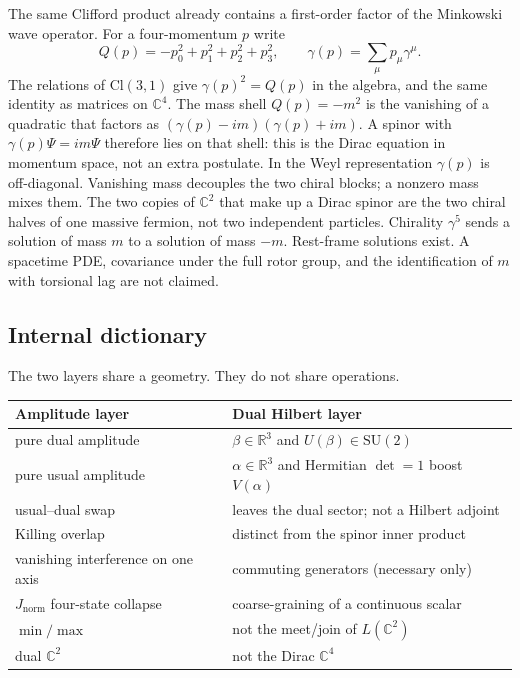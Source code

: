 \documentclass[a4paper]{article}
\theoremstyle{definition}
\newcommand{\Jnorm}{J_{\mathrm{norm}}}
\begin{document}
The same Clifford product already contains a first-order factor of the
Minkowski wave operator. For a four-momentum \(p\) write
\[
Q(p)=-p_0^2+p_1^2+p_2^2+p_3^2,\qquad
\gamma(p)=\sum_{\mu}p_\mu\gamma^\mu.
\]
The relations of \(\mathrm{Cl}(3,1)\) give \(\gamma(p)^2=Q(p)\) in the
algebra, and the same identity as matrices on \(\mathbb{C}^4\). The mass
shell \(Q(p)=-m^2\) is the vanishing of a quadratic that factors as
\((\gamma(p)-im)(\gamma(p)+im)\). A spinor with
\(\gamma(p)\Psi=im\Psi\) therefore lies on that shell: this is the
Dirac equation in momentum space, not an extra postulate. In the Weyl
representation \(\gamma(p)\) is off-diagonal. Vanishing mass decouples
the two chiral blocks; a nonzero mass mixes them. The two copies of
\(\mathbb{C}^2\) that make up a Dirac spinor are the two chiral halves
of one massive fermion, not two independent particles. Chirality
\(\gamma^5\) sends a solution of mass \(m\) to a solution of mass
\(-m\). Rest-frame solutions exist. A spacetime PDE, covariance under
the full rotor group, and the identification of \(m\) with torsional
lag are not claimed.

\subsection{Internal dictionary}
\label{sec:dict}

The two layers share a geometry. They do not share operations.

\begin{center}
\begin{tabular}{@{}ll@{}}
\toprule
Amplitude layer & Dual Hilbert layer \\
\midrule
pure dual amplitude & \(\beta\in\mathbb{R}^3\) and \(U(\beta)\in\mathrm{SU}(2)\) \\
pure usual amplitude & \(\alpha\in\mathbb{R}^3\) and Hermitian \(\det=1\) boost \(V(\alpha)\) \\
usual--dual swap & leaves the dual sector; not a Hilbert adjoint \\
Killing overlap & distinct from the spinor inner product \\
vanishing interference on one axis & commuting generators (necessary only) \\
\(\Jnorm\) four-state collapse & coarse-graining of a continuous scalar \\
\(\min/\max\) & not the meet/join of \(L(\mathbb{C}^2)\) \\
dual \(\mathbb{C}^2\) & not the Dirac \(\mathbb{C}^4\) \\
\bottomrule
\end{tabular}
\end{center}
\end{document}
